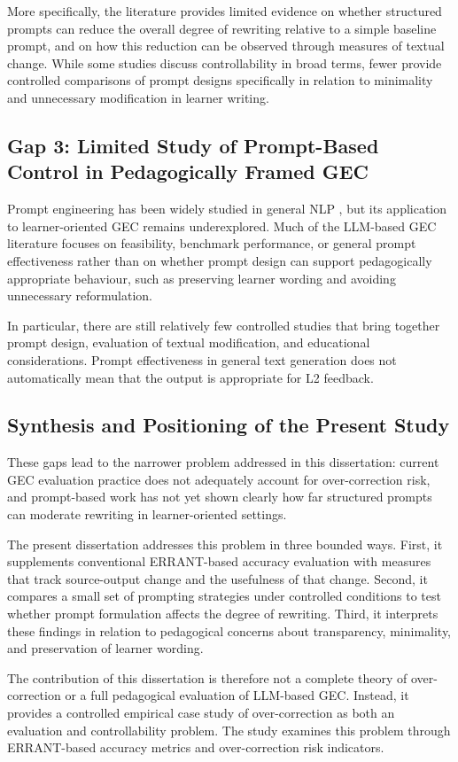 More specifically, the literature provides limited evidence on whether structured prompts can reduce the overall degree of rewriting relative to a simple baseline prompt, and on how this reduction can be observed through measures of textual change. While some studies discuss controllability in broad terms, fewer provide controlled comparisons of prompt designs specifically in relation to minimality and unnecessary modification in learner writing.

\subsection{Gap 3: Limited Study of Prompt-Based Control in Pedagogically Framed GEC}

Prompt engineering has been widely studied in general NLP \cite{liu2023pretrain,wei2022finetuned}, but its application to learner-oriented GEC remains underexplored. Much of the LLM-based GEC literature focuses on feasibility, benchmark performance, or general prompt effectiveness rather than on whether prompt design can support pedagogically appropriate behaviour, such as preserving learner wording and avoiding unnecessary reformulation.

In particular, there are still relatively few controlled studies that bring together prompt design, evaluation of textual modification, and educational considerations. Prompt effectiveness in general text generation does not automatically mean that the output is appropriate for L2 feedback.

\subsection*{Synthesis and Positioning of the Present Study}

These gaps lead to the narrower problem addressed in this dissertation: current GEC evaluation practice does not adequately account for over-correction risk, and prompt-based work has not yet shown clearly how far structured prompts can moderate rewriting in learner-oriented settings.

The present dissertation addresses this problem in three bounded ways. First, it supplements conventional ERRANT-based accuracy evaluation with measures that track source-output change and the usefulness of that change. Second, it compares a small set of prompting strategies under controlled conditions to test whether prompt formulation affects the degree of rewriting. Third, it interprets these findings in relation to pedagogical concerns about transparency, minimality, and preservation of learner wording.

The contribution of this dissertation is therefore not a complete theory of over-correction or a full pedagogical evaluation of LLM-based GEC. Instead, it provides a controlled empirical case study of over-correction as both an evaluation and controllability problem. The study examines this problem through ERRANT-based accuracy metrics and over-correction risk indicators.
